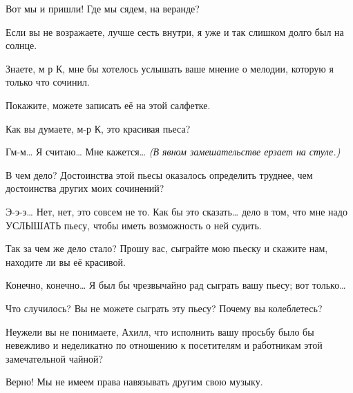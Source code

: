 \documentclass[../main.tex]{subfiles}
\begin{document}
\begin{dialogue}
 Вот мы и пришли! Где мы сядем, на веранде?

 Если вы не возражаете, лучше сесть внутри, я уже и так слишком долго был на солнце.


 Знаете, м р К, мне бы хотелось услышать ваше мнение о мелодии, которую я только что сочинил.

 Покажите, можете записать её на этой салфетке.


 Как вы думаете, м-р К, это красивая пьеса?

 Гм-м\ldots{} Я считаю\ldots{} Мне кажется\ldots{} \emph{(В явном замешательстве ерзает на стуле.)}

 В чем дело? Достоинства этой пьесы оказалось определить труднее, чем достоинства других моих сочинений?

 Э-э-э\ldots{} Нет, нет, это совсем не то. Как бы это сказать\ldots{} дело в том, что мне надо УСЛЫШАТЬ пьесу, чтобы иметь возможность о ней судить.

 Так за чем же дело стало? Прошу вас, сыграйте мою пьеску и скажите нам, находите ли вы её красивой.

 Конечно, конечно\ldots{} Я был бы чрезвычайно рад сыграть вашу пьесу; вот только\ldots{}

 Что случилось? Вы не можете сыграть эту пьесу? Почему вы колеблетесь?

 Неужели вы не понимаете, Ахилл, что исполнить вашу просьбу было бы невежливо и неделикатно по отношению к посетителям и работникам этой замечательной чайной?

 Верно! Мы не имеем права навязывать другим свою музыку.


\end{dialogue}
\end{document}
